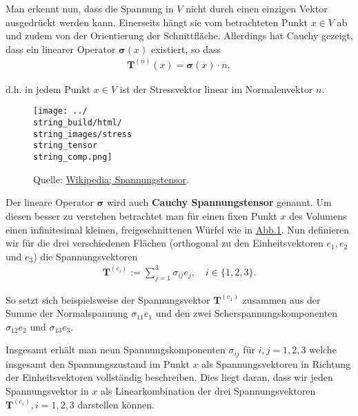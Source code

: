 \par
Man erkennt nun, dass die Spannung in \(V\) nicht durch einen einzigen Vektor ausgedrückt werden kann. Einerseits hängt sie vom betrachteten Punkt \(x\in V\) ab und zudem von der Orientierung der Schnittfläche. Allerdings hat Cauchy gezeigt, dass ein linearer Operator \(\mathbf{\sigma}(x)\) existiert, so dass
\begin{align*}
\mathbf{T}^{(n)}(x) = \mathbf{\sigma}(x) \cdot n,
\end{align*}
\par
d.h. in jedem Punkt \(x\in V\) ist der Stressvektor linear im Normalenvektor \(n\).

\begin{figure}[htbp]
\centering


\noindent\texttt{[image: ../\\string\_build/html/\\string\_images/stress\\string\_tensor\\string\_comp.png]}
\caption{Quelle: \href{https://de.wikipedia.org/wiki/Spannungstensor}{Wikipedia; Spannungstensor}.}\label{\detokenize{vektoranalysis/tensor:fig-stress-comp}}\end{figure}

\par
Der lineare Operator \(\mathbf{\sigma}\) wird auch \textbf{Cauchy Spannungstensor} genannt.
Um diesen besser zu verstehen betrachtet man für einen fixen Punkt \(x\) des Volumens einen infinitesimal kleinen, freigeschnittenen Würfel wie in \hyperref[\detokenize{vektoranalysis/tensor:fig-stress-comp}]{Abb.\@ \ref{\detokenize{vektoranalysis/tensor:fig-stress-comp}}}.
Nun definieren wir für die drei verschiedenen Flächen (orthogonal zu den Einheitsvektoren \(e_1, e_2\) und \(e_3\)) die Spannungsvektoren
\begin{align*}
\mathbf{T}^{(e_i)}:= \sum_{j=1}^3 \sigma_{ij} e_j, \quad i \in \lbrace 1,2,3 \rbrace.
\end{align*}
\par
So setzt sich beispielsweise der Spannungsvektor \(\mathbf{T}^{(e_1)}\) zusammen aus der Summe der Normalspannung \(\sigma_{11} e_1\) und den zwei Scherspannungskomponenten \(\sigma_{12} e_2\) und \(\sigma_{13} e_3\).

\par
Insgesamt erhält man neun Spannungskomponenten \(\sigma_{ij}\) für \(i,j=1,2,3\) welche insgesamt den Spannungszustand im Punkt \(x\) als Spannungsvektoren in Richtung der Einheitsvektoren vollständig beschreiben.
Dies liegt daran, dass wir jeden Spannungsvektor in \(x\) als Linearkombination der drei Spannungsvektoren \(\mathbf{T}^{(e_i)}, i=1,2,3\) darstellen können.

